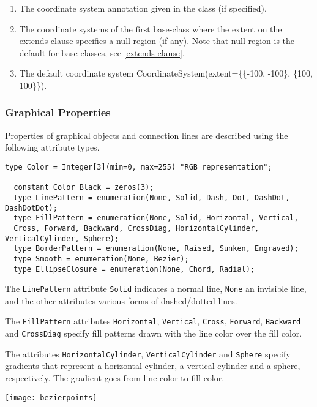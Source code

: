 \begin{enumerate}
\item
  The coordinate system annotation given in the class (if specified).
\item
  The coordinate systems of the first base-class where the extent on the
  extends-clause specifies a null-region (if any). Note that null-region
  is the default for base-classes, see \autoref{extends-clause}.
\item
  The default coordinate system CoordinateSystem(extent=\{\{-100,
  -100\}, \{100, 100\}\}).
\end{enumerate}

\subsubsection{Graphical Properties}

Properties of graphical objects and connection lines are described using
the following attribute types.

\begin{lstlisting}[language=modelica]
  type Color = Integer[3](min=0, max=255) "RGB representation";

  constant Color Black = zeros(3);
  type LinePattern = enumeration(None, Solid, Dash, Dot, DashDot, DashDotDot);
  type FillPattern = enumeration(None, Solid, Horizontal, Vertical,
  Cross, Forward, Backward, CrossDiag, HorizontalCylinder, VerticalCylinder, Sphere);
  type BorderPattern = enumeration(None, Raised, Sunken, Engraved);
  type Smooth = enumeration(None, Bezier);
  type EllipseClosure = enumeration(None, Chord, Radial);
\end{lstlisting}
The \lstinline!LinePattern! attribute \lstinline!Solid! indicates a normal line, \lstinline!None! an
invisible line, and the other attributes various forms of dashed/dotted
lines.

The \lstinline!FillPattern! attributes \lstinline!Horizontal!, \lstinline!Vertical!,
\lstinline!Cross!, \lstinline!Forward!,
\lstinline!Backward! and \lstinline!CrossDiag! specify fill patterns drawn with the line color
over the fill color.

The attributes \lstinline!HorizontalCylinder!, \lstinline!VerticalCylinder! and \lstinline!Sphere! specify
gradients that represent a horizontal cylinder, a vertical cylinder and
a sphere, respectively. The gradient goes from line color to fill color.

\texttt{[image: bezierpoints]}

